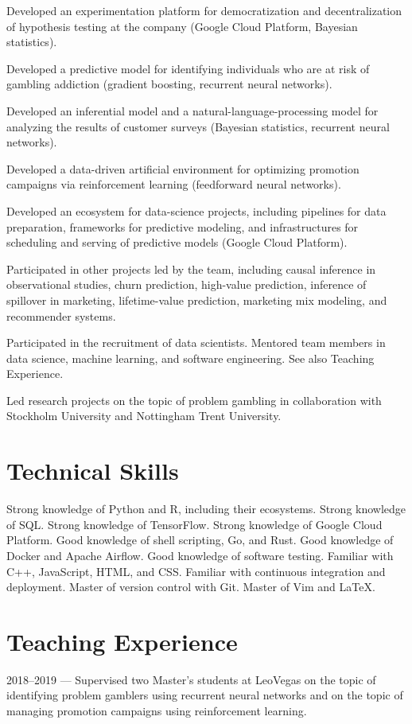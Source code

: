 \documentclass[journal]{IEEEtran}
\begin{document}
Developed an experimentation platform for democratization and decentralization
of hypothesis testing at the company (Google Cloud Platform, Bayesian
statistics).

Developed a predictive model for identifying individuals who are at risk of
gambling addiction (gradient boosting, recurrent neural networks).

Developed an inferential model and a natural-language-processing model for
analyzing the results of customer surveys (Bayesian statistics, recurrent neural
networks).

Developed a data-driven artificial environment for optimizing promotion
campaigns via reinforcement learning (feedforward neural networks).

Developed an ecosystem for data-science projects, including pipelines for data
preparation, frameworks for predictive modeling, and infrastructures for
scheduling and serving of predictive models (Google Cloud Platform).

Participated in other projects led by the team, including causal inference in
observational studies, churn prediction, high-value prediction, inference of
spillover in marketing, lifetime-value prediction, marketing mix modeling, and
recommender systems.

Participated in the recruitment of data scientists. Mentored team members in
data science, machine learning, and software engineering. See also Teaching
Experience.

Led research projects on the topic of problem gambling in collaboration with
Stockholm University and Nottingham Trent University.

\section{Technical Skills}
Strong knowledge of Python and R, including their ecosystems. Strong knowledge
of SQL. Strong knowledge of TensorFlow. Strong knowledge of Google Cloud
Platform. Good knowledge of shell scripting, Go, and Rust. Good knowledge of
Docker and Apache Airflow. Good knowledge of software testing. Familiar with
C++, JavaScript, HTML, and CSS. Familiar with continuous integration and
deployment. Master of version control with Git. Master of Vim and LaTeX.

\section{Teaching Experience}
2018--2019 --- Supervised two Master's students at LeoVegas on the topic of
identifying problem gamblers using recurrent neural networks and on the topic
of managing promotion campaigns using reinforcement learning.
\end{document}
